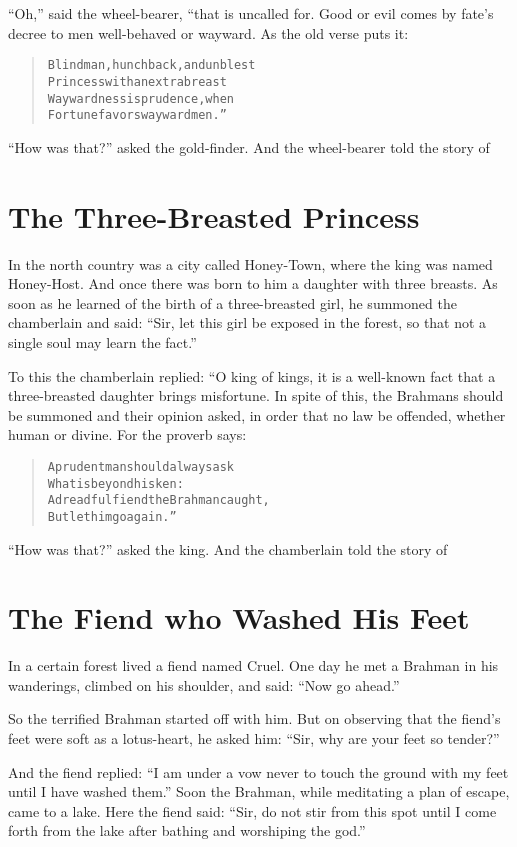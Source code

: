 \documentclass[article, twoside, 14pt]{memoir}
\renewenvironment{verbatim}{%
\begin{quote}%
\vskip -10pt%
\begin{alltt}\normalfont\large}{\end{alltt}%
\end{quote}%
\vskip -10pt
} %
\begin{document}
``Oh,'' said the wheel-bearer, “that is uncalled for. Good or evil
comes by fate's decree to men well-behaved or wayward. As the old
verse puts it:

\begin{verbatim}
Blind man, hunchback, and unblest
Princess with an extra breast{\textemdash}
Waywardness is prudence, when
Fortune favors wayward men.”
\end{verbatim}
``How was that?'' asked the gold-finder. And the wheel-bearer told
the story of

\chapter{The Three-Breasted Princess}

\label{s89}

In the north country was a city called Honey-Town, where the king
was named Honey-Host. And once there was born to him a daughter
with three breasts. As soon as he learned of the birth of a
three-breasted girl, he summoned the chamberlain and said:
``Sir, let this girl be exposed in the forest, so that not a single soul may learn the fact.''

To this the chamberlain replied: “O king of kings, it is a
well-known fact that a three-breasted daughter brings misfortune.
In spite of this, the Brahmans should be summoned and their opinion
asked, in order that no law be offended, whether human or divine.
For the proverb says:

\begin{verbatim}
A prudent man should always ask
    What is beyond his ken:
A dreadful fiend the Brahman caught,
    But let him go again.”
\end{verbatim}
``How was that?'' asked the king. And the chamberlain told the
story of

\chapter{The Fiend who Washed His Feet}

\label{s90}

In a certain forest lived a fiend named Cruel. One day he met a
Brahman in his wanderings, climbed on his shoulder, and said:
``Now go ahead.''

So the terrified Brahman started off with him. But on observing
that the fiend's feet were soft as a lotus-heart, he asked him:
``Sir, why are your feet so tender?''

And the fiend replied:
``I am under a vow never to touch the ground with my feet until I have washed them.''
Soon the Brahman, while meditating a plan of escape, came to
a lake. Here the fiend said:
``Sir, do not stir from this spot until I come forth from the lake after bathing and worshiping the god.''
\end{document}
